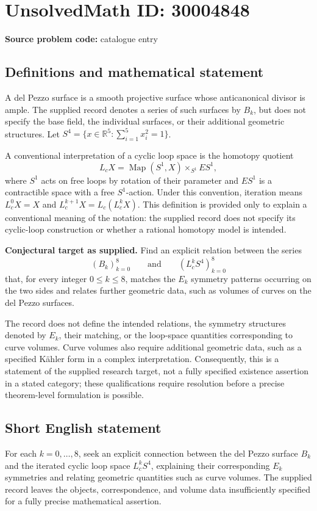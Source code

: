\documentclass[11pt]{article}
\newcommand{\R}{\mathbb{R}}
\begin{document}
\section*{UnsolvedMath ID: 30004848}
\textbf{Source problem code:} catalogue entry
\subsection{Definitions and mathematical statement}
A del Pezzo surface is a smooth projective surface whose anticanonical divisor is ample. The supplied record denotes a series of such surfaces by \(B_k\), but does not specify the base field, the individual surfaces, or their additional geometric structures. Let \(S^4=\{x\in\R^5:\sum_{i=1}^{5}x_i^2=1\}\).

A conventional interpretation of a cyclic loop space is the homotopy quotient
\[
L_cX=\operatorname{Map}(S^1,X)\times_{S^1}ES^1,
\]
where \(S^1\) acts on free loops by rotation of their parameter and \(ES^1\) is a contractible space with a free \(S^1\)-action. Under this convention, iteration means \(L_c^0X=X\) and \(L_c^{k+1}X=L_c(L_c^kX)\). This definition is provided only to explain a conventional meaning of the notation: the supplied record does not specify its cyclic-loop construction or whether a rational homotopy model is intended.

\textbf{Conjectural target as supplied.} Find an explicit relation between the series
\[
(B_k)_{k=0}^{8}\qquad\text{and}\qquad(L_c^kS^4)_{k=0}^{8}
\]
that, for every integer \(0\leq k\leq8\), matches the \(E_k\) symmetry patterns occurring on the two sides and relates further geometric data, such as volumes of curves on the del Pezzo surfaces.

The record does not define the intended relations, the symmetry structures denoted by \(E_k\), their matching, or the loop-space quantities corresponding to curve volumes. Curve volumes also require additional geometric data, such as a specified K\"ahler form in a complex interpretation. Consequently, this is a statement of the supplied research target, not a fully specified existence assertion in a stated category; these qualifications require resolution before a precise theorem-level formulation is possible.
\subsection{Short English statement}
For each \(k=0,\ldots,8\), seek an explicit connection between the del Pezzo surface \(B_k\) and the iterated cyclic loop space \(L_c^kS^4\), explaining their corresponding \(E_k\) symmetries and relating geometric quantities such as curve volumes. The supplied record leaves the objects, correspondence, and volume data insufficiently specified for a fully precise mathematical assertion.
\end{document}
